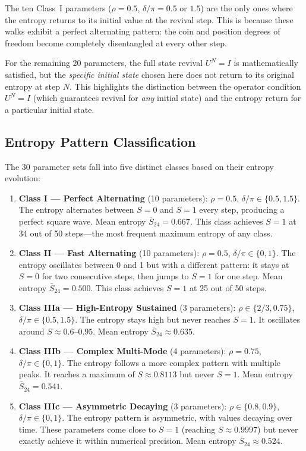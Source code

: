 \documentclass[12pt,a4paper]{article}
\begin{document}
The ten Class~I parameters ($\rho = 0.5$, $\delta/\pi = 0.5$ or $1.5$) are the only ones where the entropy returns to its initial value at the revival step. This is because these walks exhibit a perfect alternating pattern: the coin and position degrees of freedom become completely disentangled at every other step.

For the remaining 20 parameters, the full state revival $U^N = I$ is mathematically satisfied, but the \emph{specific initial state} chosen here does not return to its original entropy at step $N$. This highlights the distinction between the operator condition $U^N = I$ (which guarantees revival for \emph{any} initial state) and the entropy return for a particular initial state.

\subsection{Entropy Pattern Classification}

The 30 parameter sets fall into five distinct classes based on their entropy evolution:

\begin{enumerate}
    \item \textbf{Class I --- Perfect Alternating} (10 parameters): $\rho = 0.5$, $\delta/\pi \in \{0.5, 1.5\}$. The entropy alternates between $S=0$ and $S=1$ every step, producing a perfect square wave. Mean entropy $\bar{S}_{24} = 0.667$. This class achieves $S=1$ at 34 out of 50 steps---the most frequent maximum entropy of any class.

    \item \textbf{Class II --- Fast Alternating} (10 parameters): $\rho = 0.5$, $\delta/\pi \in \{0, 1\}$. The entropy oscillates between 0 and 1 but with a different pattern: it stays at $S=0$ for two consecutive steps, then jumps to $S=1$ for one step. Mean entropy $\bar{S}_{24} = 0.500$. This class achieves $S=1$ at 25 out of 50 steps.

    \item \textbf{Class IIIa --- High-Entropy Sustained} (3 parameters): $\rho \in \{2/3, 0.75\}$, $\delta/\pi \in \{0.5, 1.5\}$. The entropy stays high but never reaches $S=1$. It oscillates around $S \approx 0.6$--$0.95$. Mean entropy $\bar{S}_{24} \approx 0.635$.

    \item \textbf{Class IIIb --- Complex Multi-Mode} (4 parameters): $\rho = 0.75$, $\delta/\pi \in \{0, 1\}$. The entropy follows a more complex pattern with multiple peaks. It reaches a maximum of $S \approx 0.8113$ but never $S=1$. Mean entropy $\bar{S}_{24} = 0.541$.

    \item \textbf{Class IIIc --- Asymmetric Decaying} (3 parameters): $\rho \in \{0.8, 0.9\}$, $\delta/\pi \in \{0, 1\}$. The entropy pattern is asymmetric, with values decaying over time. These parameters come close to $S=1$ (reaching $S \approx 0.9997$) but never exactly achieve it within numerical precision. Mean entropy $\bar{S}_{24} \approx 0.524$.
\end{enumerate}
\end{document}

